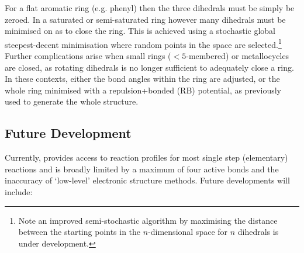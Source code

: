 \documentclass[../../main.tex]{subfiles}
\begin{document}
For a flat aromatic ring (e.g. phenyl) then the three dihedrals must be simply be zeroed. In a saturated or semi-saturated ring however many dihedrals must be minimised on as to close the ring. This is achieved using a stochastic global steepest-decent minimisation where random points in the space are selected.\footnote{Note an improved semi-stochastic algorithm by maximising the distance between the starting points in the $n$-dimensional space for $n$ dihedrals is under development.} Further complications arise when small rings ($< 5$-membered) or metallocycles are closed, as rotating dihedrals is no longer sufficient to adequately close a ring. In these contexts, either the bond angles within the ring are adjusted, or the whole ring minimised with a repulsion+bonded (RB) potential, as previously used to generate the whole structure.

\subsection{Future Development}

Currently, \ade provides access to reaction profiles for most single step (elementary) reactions and is broadly limited by a maximum of four active bonds and the inaccuracy of `low-level' electronic structure methods. Future developments will include:
\end{document}

